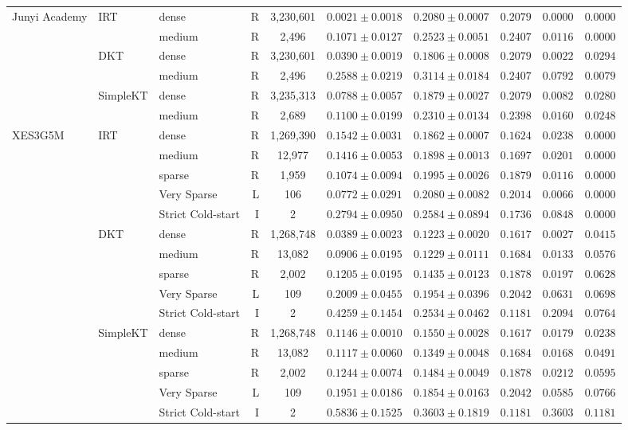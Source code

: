 \begin{table}[htbp]
{\begin{tabular}{lllrcccccc}
Junyi Academy & IRT & dense & R & 3,230,601 & $0.0021 \pm 0.0018$ & $0.2080 \pm 0.0007$ & $0.2079$ & $0.0000$ & $0.0000$ \\
 &  & medium & R & 2,496 & $0.1071 \pm 0.0127$ & $0.2523 \pm 0.0051$ & $0.2407$ & $0.0116$ & $0.0000$ \\
 & DKT & dense & R & 3,230,601 & $0.0390 \pm 0.0019$ & $0.1806 \pm 0.0008$ & $0.2079$ & $0.0022$ & $0.0294$ \\
 &  & medium & R & 2,496 & $0.2588 \pm 0.0219$ & $0.3114 \pm 0.0184$ & $0.2407$ & $0.0792$ & $0.0079$ \\
 & SimpleKT & dense & R & 3,235,313 & $0.0788 \pm 0.0057$ & $0.1879 \pm 0.0027$ & $0.2079$ & $0.0082$ & $0.0280$ \\
 &  & medium & R & 2,689 & $0.1100 \pm 0.0199$ & $0.2310 \pm 0.0134$ & $0.2398$ & $0.0160$ & $0.0248$ \\
\midrule
XES3G5M & IRT & dense & R & 1,269,390 & $0.1542 \pm 0.0031$ & $0.1862 \pm 0.0007$ & $0.1624$ & $0.0238$ & $0.0000$ \\
 &  & medium & R & 12,977 & $0.1416 \pm 0.0053$ & $0.1898 \pm 0.0013$ & $0.1697$ & $0.0201$ & $0.0000$ \\
 &  & sparse & R & 1,959 & $0.1074 \pm 0.0094$ & $0.1995 \pm 0.0026$ & $0.1879$ & $0.0116$ & $0.0000$ \\
 &  & Very Sparse & L & 106 & $0.0772 \pm 0.0291$ & $0.2080 \pm 0.0082$ & $0.2014$ & $0.0066$ & $0.0000$ \\
 &  & Strict Cold-start & I & 2 & $0.2794 \pm 0.0950$ & $0.2584 \pm 0.0894$ & $0.1736$ & $0.0848$ & $0.0000$ \\
 & DKT & dense & R & 1,268,748 & $0.0389 \pm 0.0023$ & $0.1223 \pm 0.0020$ & $0.1617$ & $0.0027$ & $0.0415$ \\
 &  & medium & R & 13,082 & $0.0906 \pm 0.0195$ & $0.1229 \pm 0.0111$ & $0.1684$ & $0.0133$ & $0.0576$ \\
 &  & sparse & R & 2,002 & $0.1205 \pm 0.0195$ & $0.1435 \pm 0.0123$ & $0.1878$ & $0.0197$ & $0.0628$ \\
 &  & Very Sparse & L & 109 & $0.2009 \pm 0.0455$ & $0.1954 \pm 0.0396$ & $0.2042$ & $0.0631$ & $0.0698$ \\
 &  & Strict Cold-start & I & 2 & $0.4259 \pm 0.1454$ & $0.2534 \pm 0.0462$ & $0.1181$ & $0.2094$ & $0.0764$ \\
 & SimpleKT & dense & R & 1,268,748 & $0.1146 \pm 0.0010$ & $0.1550 \pm 0.0028$ & $0.1617$ & $0.0179$ & $0.0238$ \\
 &  & medium & R & 13,082 & $0.1117 \pm 0.0060$ & $0.1349 \pm 0.0048$ & $0.1684$ & $0.0168$ & $0.0491$ \\
 &  & sparse & R & 2,002 & $0.1244 \pm 0.0074$ & $0.1484 \pm 0.0049$ & $0.1878$ & $0.0212$ & $0.0595$ \\
 &  & Very Sparse & L & 109 & $0.1951 \pm 0.0186$ & $0.1854 \pm 0.0163$ & $0.2042$ & $0.0585$ & $0.0766$ \\
 &  & Strict Cold-start & I & 2 & $0.5836 \pm 0.1525$ & $0.3603 \pm 0.1819$ & $0.1181$ & $0.3603$ & $0.1181$ \\
\bottomrule


\end{tabular}}
\end{table}

